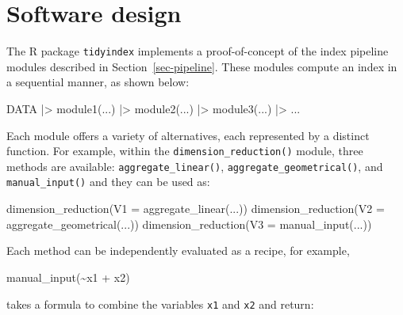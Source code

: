 \documentclass[
]{interact}
\newenvironment{Shaded}{\begin{snugshade}}{\end{snugshade}}
\newcommand{\AttributeTok}[1]{\textcolor[rgb]{0.40,0.45,0.13}{#1}}
\newcommand{\FunctionTok}[1]{\textcolor[rgb]{0.28,0.35,0.67}{#1}}
\newcommand{\NormalTok}[1]{\textcolor[rgb]{0.00,0.23,0.31}{#1}}
\newcommand{\SpecialCharTok}[1]{\textcolor[rgb]{0.37,0.37,0.37}{#1}}
\begin{document}
\hypertarget{sec-software}{%
\section{Software design}\label{sec-software}}

The R package \texttt{tidyindex} implements a proof-of-concept of the
index pipeline modules described in Section~\ref{sec-pipeline}. These
modules compute an index in a sequential manner, as shown below:

\begin{Shaded}
\begin{Highlighting}[]
\NormalTok{DATA }\SpecialCharTok{|\textgreater{}} 
  \FunctionTok{module1}\NormalTok{(...) }\SpecialCharTok{|\textgreater{}}
  \FunctionTok{module2}\NormalTok{(...) }\SpecialCharTok{|\textgreater{}}
  \FunctionTok{module3}\NormalTok{(...) }\SpecialCharTok{|\textgreater{}}
\NormalTok{  ...}
\end{Highlighting}
\end{Shaded}

Each module offers a variety of alternatives, each represented by a
distinct function. For example, within the
\texttt{dimension\_reduction()} module, three methods are available:
\texttt{aggregate\_linear()}, \texttt{aggregate\_geometrical()}, and
\texttt{manual\_input()} and they can be used as:

\begin{Shaded}
\begin{Highlighting}[]
\FunctionTok{dimension\_reduction}\NormalTok{(}\AttributeTok{V1 =} \FunctionTok{aggregate\_linear}\NormalTok{(...))}
\FunctionTok{dimension\_reduction}\NormalTok{(}\AttributeTok{V2 =} \FunctionTok{aggregate\_geometrical}\NormalTok{(...))}
\FunctionTok{dimension\_reduction}\NormalTok{(}\AttributeTok{V3 =} \FunctionTok{manual\_input}\NormalTok{(...))}
\end{Highlighting}
\end{Shaded}

Each method can be independently evaluated as a recipe, for example,

\begin{Shaded}
\begin{Highlighting}[]
\FunctionTok{manual\_input}\NormalTok{(}\SpecialCharTok{\textasciitilde{}}\NormalTok{x1 }\SpecialCharTok{+}\NormalTok{ x2)}
\end{Highlighting}
\end{Shaded}

takes a formula to combine the variables \texttt{x1} and \texttt{x2} and
return:
\end{document}
